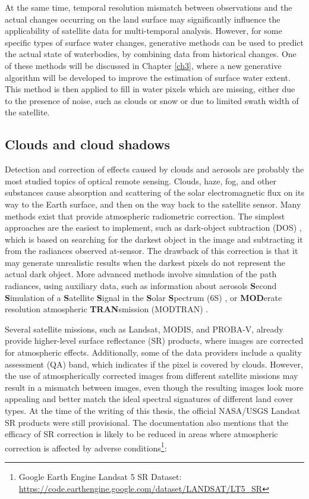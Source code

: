 At the same time, temporal resolution mismatch between observations and the actual changes occurring on the land surface may significantly influence the applicability of satellite data for multi-temporal analysis. However, for some specific types of surface water changes, generative methods can be used to predict the actual state of waterbodies, by combining data from historical changes. One of these methods will be discussed in Chapter \ref{ch3}, where a new generative algorithm will be developed to improve the estimation of surface water extent. This method is then applied to fill in water pixels which are missing, either due to the presence of noise, such as clouds or snow or due to limited swath width of the satellite.

\subsection{Clouds and cloud shadows}

Detection and correction of effects caused by clouds and aerosols are probably the most studied topics of optical remote sensing. Clouds, haze, fog, and other substances cause absorption and scattering of the solar electromagnetic flux on its way to the Earth surface, and then on the way back to the satellite sensor. Many methods exist that provide atmospheric radiometric correction. The simplest approaches are the easiest to implement, such as dark-object subtraction (DOS) \citep{chavez1996image}, which is based on searching for the darkest object in the image and subtracting it from the radiances observed at-sensor. The drawback of this correction is that it may generate unrealistic results when the darkest pixels do not represent the actual dark object. More advanced methods involve simulation of the path radiances, using auxiliary data, such as information about aerosols \textbf{S}econd \textbf{S}imulation of a \textbf{S}atellite \textbf{S}ignal in the \textbf{S}olar \textbf{S}pectrum (6S) \citep{vermote1997second}, \citep{zhang2012improved} or \textbf{MOD}erate resolution atmospheric \textbf{TRAN}smission (MODTRAN) \citep{berk1987modtran}. 

Several satellite missions, such as Landsat, MODIS, and PROBA-V, already provide higher-level surface reflectance (SR) products, where images are corrected for atmospheric effects. Additionally, some of the data providers include a quality assessment (QA) band, which indicates if the pixel is covered by clouds. However, the use of atmospherically corrected images from different satellite missions may result in a mismatch between images, even though the resulting images look more appealing and better match the ideal spectral signatures of different land cover types. At the time of the writing of this thesis, the official NASA/USGS Landsat SR products were still provisional. The documentation also mentions that the efficacy of SR correction is likely to be reduced in areas where atmospheric correction is affected by adverse conditions\footnote{Google Earth Engine Landsat 5 SR Dataset: \url{https://code.earthengine.google.com/dataset/LANDSAT/LT5\_SR}}:

